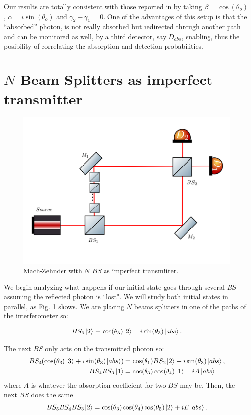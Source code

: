 \documentclass{book}
\begin{document}

Our results are totally consistent with those reported in \cite{zuri,azuri} by taking $\beta=\cos(\theta_{o})$, $\alpha=i \sin(\theta_{o})$ and $\gamma_{2}-\gamma_{1}=0$. One of the advantages of this setup is that the ``absorbed'' photon, is not really absorbed but redirected through another path and can be monitored as well, by a third detector, say $D_{abs}$, enabling, thus the posibility of correlating the absorption and detection probabilities.

\section{$N$ Beam Splitters as imperfect transmitter }


\begin{figure}[H]
\centering
\includegraphics[width=\linewidth,height=8 cm]{images/machzenhderBSS.png}
\caption{Mach-Zehnder with $N$ $BS$ as imperfect transmitter.}
\label{N_bs}
\end{figure}


We begin analyzing what happens if our initial state goes through several $BS$ assuming the reflected photon is ``lost". We will study both initial states in parallel, as Fig. \ref{N_bs} shows. We are placing $N$ beams splitters in one of the paths of the interferometer so:

\begin{align}
BS_{3}\ket{2}=\cos(\theta_{3})\ket{2}+i\sin(\theta_{3})\ket{abs}.
\end{align}

The next $BS$ only acts on the transmitted photon so:
\begin{align}
BS_{4}(\cos(\theta_{3})\ket{3}+i\sin(\theta_{3})\ket{abs})&=\cos(\theta_{1})BS_{2}\ket{2}+i\sin(\theta_{3})\ket{abs},\\
BS_{4}BS_{3}\ket{1}&=\cos(\theta_{3})\cos(\theta_{4})\ket{1}+i A\ket{abs}.
\end{align}
where $A$ is whatever the absorption coefficient for two $BS$ may be. Then, the next $BS$ does the same
\begin{equation}
BS_{5}BS_{4}BS_{3}\ket{2}=\cos(\theta_{3})\cos(\theta_{4})\cos(\theta_{5})\ket{2}+iB\ket{abs}.
\end{equation}
\end{document}

